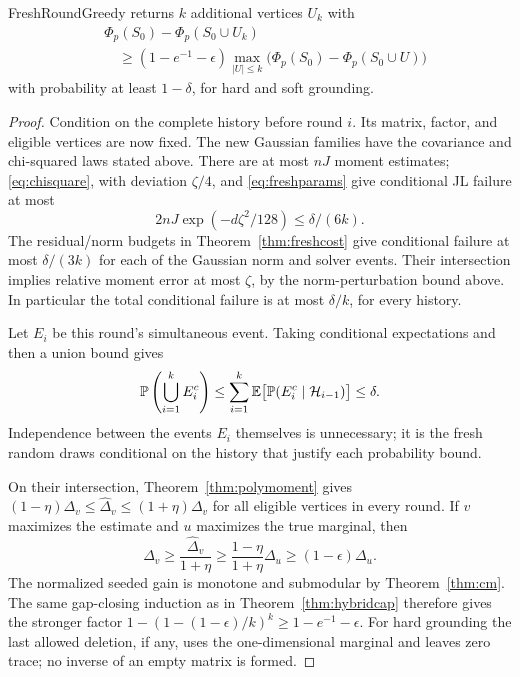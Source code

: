 \begin{theorem}\label{thm:freshgreedy}
FreshRoundGreedy returns $k$ additional vertices $U_k$ with
\begin{equation}\label{eq:freshgain}
\begin{aligned}
 &\Phi_p(S_0)-\Phi_p(S_0\cup U_k)\\
 &\quad\geq(1-e^{-1}-\epsilon)
   \max_{|U|\leq k}\bigl(\Phi_p(S_0)-\Phi_p(S_0\cup U)\bigr)
\end{aligned}
\end{equation}
with probability at least $1-\delta$, for hard and soft grounding.
\end{theorem}
\begin{proof}
Condition on the complete history before round $i$. Its matrix,
factor, and eligible vertices are now fixed. The new Gaussian
families have the covariance and chi-squared laws stated above. There are at most $nJ$ moment estimates;
\eqref{eq:chisquare}, with deviation $\zeta/4$, and
\eqref{eq:freshparams} give conditional JL failure at most
\[
 2nJ\exp(-d\zeta^2/128)\leq\delta/(6k).
\]
The residual/norm budgets in Theorem~\ref{thm:freshcost} give
conditional failure at most $\delta/(3k)$ for each of the Gaussian
norm and solver events. Their intersection implies relative moment
error at most $\zeta$, by the norm-perturbation bound above. In particular the total conditional
failure is at most $\delta/k$, for every history.

Let $E_i$ be this round's simultaneous event. Taking conditional
expectations and then a union bound gives
\[
 \mathbb P\left(\bigcup_{i=1}^k E_i^c\right)
 \leq\sum_{i=1}^k\mathbb E\bigl[\mathbb P(E_i^c\mid\mathcal H_{i-1})\bigr]
 \leq\delta.
\]
Independence between the events $E_i$ themselves is unnecessary;
it is the fresh random draws conditional on the history that
justify each probability bound.

On their intersection, Theorem~\ref{thm:polymoment} gives
$(1-\eta)\Delta_v\leq\widehat\Delta_v\leq(1+\eta)\Delta_v$
for all eligible vertices in every round. If $v$ maximizes the
estimate and $u$ maximizes the true marginal, then
\[
 \Delta_v\geq\frac{\widehat\Delta_v}{1+\eta}
 \geq\frac{1-\eta}{1+\eta}\Delta_u
 \geq(1-\epsilon)\Delta_u.
\]
The normalized seeded gain is monotone and submodular by Theorem~\ref{thm:cm}.
The same gap-closing induction as in Theorem~\ref{thm:hybridcap}
therefore gives the stronger factor
$1-(1-(1-\epsilon)/k)^k\geq1-e^{-1}-\epsilon$.
For hard grounding the last allowed deletion, if any, uses the
one-dimensional marginal and leaves zero trace; no inverse of
an empty matrix is formed.
\end{proof}

